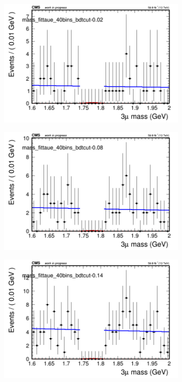 \begin{figure}[H]
    \centering
    \begin{subfigure}{0.2\textwidth}
        \includegraphics[width=\textwidth]{unfixed_exp/plots/taue/massfit_taue_40bins_bdtcut-0.02.png}
        \caption{}
    \end{subfigure}
    \begin{subfigure}{0.2\textwidth}
        \includegraphics[width=\textwidth]{unfixed_exp/plots/taue/massfit_taue_40bins_bdtcut-0.08.png}
        \caption{}
    \end{subfigure}
    \begin{subfigure}{0.2\textwidth}
        \includegraphics[width=\textwidth]{unfixed_exp/plots/taue/massfit_taue_40bins_bdtcut-0.14.png}

\end{subfigure}
\end{figure}
